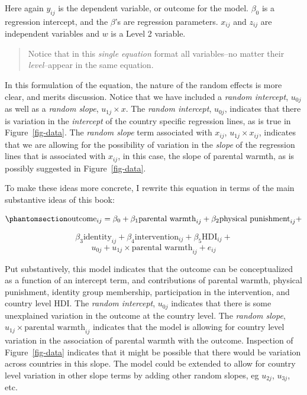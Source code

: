 \documentclass[
  letterpaper,
  DIV=11,
  numbers=noendperiod]{scrreprt}
\begin{document}
Here again \(y_{ij}\) is the dependent variable, or outcome for the
model. \(\beta_0\) is a regression intercept, and the \(\beta\)'s are
regression parameters. \(x_{ij}\) and \(z_{ij}\) are independent
variables and \(w\) is a Level 2 variable.

\begin{quote}
Notice that in this \emph{single equation} format all variables--no
matter their \emph{level}--appear in the same equation.
\end{quote}

In this formulation of the equation, the nature of the random effects is
more clear, and merits discussion. Notice that we have included a
\emph{random intercept}, \(u_{0j}\) as well as a \emph{random slope},
\(u_{1j} \times x\). The \emph{random intercept}, \(u_{0j}\), indicates
that there is variation in the \emph{intercept} of the country specific
regression lines, as is true in Figure~\ref{fig-data}. The \emph{random
slope} term associated with \(x_{ij}\), \(u_{1j} \times x_{ij}\),
indicates that we are allowing for the possibility of variation in the
\emph{slope} of the regression lines that is associated with \(x_{ij}\),
in this case, the slope of parental warmth, as is possibly suggested in
Figure~\ref{fig-data}.

To make these ideas more concrete, I rewrite this equation in terms of
the main substantive ideas of this book:

\begin{equation}\phantomsection\label{eq-MLMsubstantive}{\text{outcome}_{ij} = \beta_0 + \beta_1 \text{parental warmth}_{ij} + \beta_2 \text{physical punishment}_{ij} +}\end{equation}

\[\beta_3 \text{identity}_{ij} + \beta_4 \text{intervention}_{ij} + \beta_5 \text{HDI}_{ij} + \]
\[u_{0j} + u_{1j} \times \text{parental warmth}_{ij} + e_{ij}\]

Put substantively, this model indicates that the outcome can be
conceptualized as a function of an intercept term, and contributions of
parental warmth, physical punishment, identity group membership,
participation in the intervention, and country level HDI. The
\emph{random intercept}, \(u_{0j}\) indicates that there is some
unexplained variation in the outcome at the country level. The
\emph{random slope}, \(u_{1j} \times \text{parental warmth}_{ij}\)
indicates that the model is allowing for country level variation in the
association of parental warmth with the outcome. Inspection of
Figure~\ref{fig-data} indicates that it might be possible that there
would be variation across countries in this slope. The model could be
extended to allow for country level variation in other slope terms by
adding other random slopes, eg \(u_{2j}\), \(u_{3j}\), etc.
\end{document}
